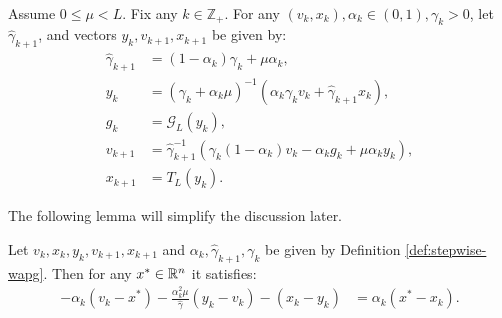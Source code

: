 \documentclass[12pt]{article}
\begin{document}
    \begin{definition}\label{def:stepwise-wapg}\;\\
        Assume $0 \le \mu < L$.
        Fix any $k \in \mathbb Z_+$.
        For any $(v_k, x_k), \alpha_k \in (0, 1), \gamma_k > 0$, let $\hat \gamma_{k + 1}$, and vectors $y_k, v_{k + 1}, x_{k + 1}$ be given by:
        \begin{align}
            \hat \gamma_{k + 1} &= (1 - \alpha_k)\gamma_k + \mu \alpha_k, \label{eqn:stepwise-wapg-eqn1}
            \\
            y_k &=
            (\gamma_k + \alpha_k \mu)^{-1}(\alpha_k \gamma_k v_k + \hat\gamma_{k + 1} x_k), \label{eqn:stepwise-wapg-eqn2}
            \\
            g_k &= \mathcal G_L (y_k), \label{eqn:stepwise-wapg-eqn3}
            \\
            v_{k + 1} &= \hat\gamma^{-1}_{k + 1}
            (\gamma_k(1 - \alpha_k) v_k - \alpha_k g_k + \mu \alpha_k y_k), \label{eqn:stepwise-wapg-eqn4}
            \\
            x_{k + 1} &= T_L(y_k). \label{eqn:stepwise-wapg-eqn5}
        \end{align}
    \end{definition}
    The following lemma will simplify the discussion later.
    \begin{lemma}\label{lemma:ineq-q3}
        Let $v_k, x_k, y_k, v_{k + 1}, x_{k + 1}$ and $\alpha_k, \hat \gamma_{k + 1}, \gamma_{k}$ be given by Definition \ref{def:stepwise-wapg}.
        Then for any $x^* \in \mathbb R^n$ it satisfies:
        \begin{align}
            - \alpha_k(v_k - x^*) - \frac{\alpha_k^2 \mu}{\hat \gamma}(y_k - v_k) - (x_k - y_k)
            &= \alpha_k(x^* - x_k).
            \tag{Q3}\label{eqn:Q3}
        \end{align}
    \end{lemma}
\end{document}
